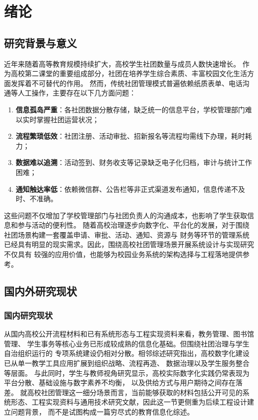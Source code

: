 ﻿%
\chapter{绪论}

\section{研究背景与意义}

近年来随着高等教育规模持续扩大，高校学生社团数量与成员人数快速增长。
作为高校第二课堂的重要组成部分，社团在培养学生综合素质、丰富校园文化生活方面发挥着不可替代的作用。
然而，传统社团管理模式普遍依赖纸质表单、电话沟通等人工操作，主要存在以下几方面问题：

\begin{enumerate}
  \item \textbf{信息孤岛严重}：各社团数据分散存储，缺乏统一的信息平台，学校管理部门难以实时掌握社团运营状况；
  \item \textbf{流程繁琐低效}：社团注册、活动审批、招新报名等流程均需线下办理，耗时耗力；
  \item \textbf{数据难以追溯}：活动签到、财务收支等记录缺乏电子化归档，审计与统计工作困难；
  \item \textbf{通知触达率低}：依赖微信群、公告栏等非正式渠道发布通知，信息传递不及时、不准确。
\end{enumerate}

这些问题不仅增加了学校管理部门与社团负责人的沟通成本，也影响了学生获取信息和参与活动的便利性。
随着高校治理逐步向数字化、平台化的发展，对于围绕社团场景构建一套覆盖申请、审批、活动、通知、资源与
财务等环节的管理系统已经具有明显的现实需求。因此，围绕高校社团管理场景开展系统设计与实现研究不仅具有
较强的应用价值，也能够为校园业务系统的架构选择与工程落地提供参考。

\section{国内外研究现状}

\subsection{国内研究现状}

从国内高校公开流程材料和已有系统形态与工程实现资料来看，教务管理、图书馆管理、
学生事务等核心业务已形成较成熟的信息化基础。但围绕社团治理与学生自治组织运行的
专项系统建设仍相对分散。相邻综述研究指出，高校数字化建设已从单一教学工具应用扩展到组织战略、流程再造、
数据治理以及学生服务整合等层面\cite{fernandez_he_dt_2023,mukul_education4_2023,mabotha_he_dt_2026}。
与此同时，学生与教师视角研究显示，高校实际数字化实践仍常表现为平台分散、基础设施与数字素养不均衡，
以及供给方式与用户期待之间存在落差\cite{aljanazrah_dt_crisis_2022,potocan_he_students_2025}。
就高校社团管理这一细分场景而言，当前能够获取的材料包括公开可见的系统形态、工程实现资料与通用技术研究文献，因此这一节更侧重为后续工程设计建立问题背景，
而不是试图构成一篇穷尽式的教育信息化综述。

